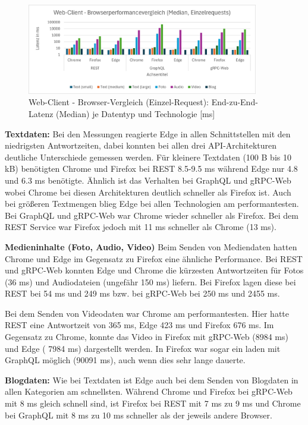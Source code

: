 \clearpage

\begin{figure}[htbp]
	\centering
	\includegraphics[width=0.9\textwidth]{images/Browserperformance.png}
	\caption{Web-Client - Browser-Vergleich (Einzel-Request): End-zu-End-Latenz (Median) je Datentyp und Technologie [ms]}
	\label{fig:webclient-browser-comparison}
\end{figure}

\textbf{Textdaten:}  
Bei den Messungen reagierte Edge in allen Schnittstellen mit den niedrigsten Antwortzeiten, dabei konnten bei allen drei API-Architekturen deutliche Unterschiede gemessen werden. Für kleinere Textdaten (100 B bis 10 kB) benötigten Chrome und Firefox bei REST 8.5-9.5 ms während Edge nur 4.8 und 6.3 ms benötigte. Ähnlich ist das Verhalten bei GraphQL und gRPC-Web wobei Chrome bei diesen Architekturen deutlich schneller als Firefox ist. Auch bei größeren Textmengen blieg Edge bei allen Technologien am performantesten. Bei GraphQL und gRPC-Web war Chrome wieder schneller als Firefox. Bei dem REST Service war Firefox jedoch mit 11 ms schneller als Chrome (13 ms).


\textbf{Medieninhalte (Foto, Audio, Video)}  
Beim Senden von Mediendaten hatten Chrome und Edge im Gegensatz zu Firefox eine ähnliche Performance. Bei REST und gRPC-Web konnten Edge und Chrome die kürzesten Antwortzeiten für Fotos (36 ms) und Audiodateien (ungefähr 150 ms)  liefern. Bei Firefox lagen diese bei REST bei 54 ms und 249 ms bzw. bei gRPC-Web bei 250 ms und 2455 ms.

Bei dem Senden von Videodaten war Chrome am performantesten. Hier hatte REST eine Antwortzeit von 365 ms, Edge 423 ms und Firefox 676 ms. Im Gegensatz zu Chrome, konnte das Video in Firefox mit gRPC-Web (8984 ms) und Edge ( 7984 ms) dargestellt werden. In Firefox war sogar ein laden mit GraphQL möglich (90091 ms), auch wenn dies sehr lange dauerte.


\textbf{Blogdaten:}  
Wie bei Textdaten ist Edge auch bei dem Senden von Blogdaten in allen Kategorien am schnellsten. Während Chrome und Firefox bei gRPC-Web mit 8 ms gleich schnell sind, ist Firefox bei REST mit 7 ms zu 9 ms und Chrome bei GraphQL mit 8 ms zu 10 ms schneller als der jeweils andere Browser.


